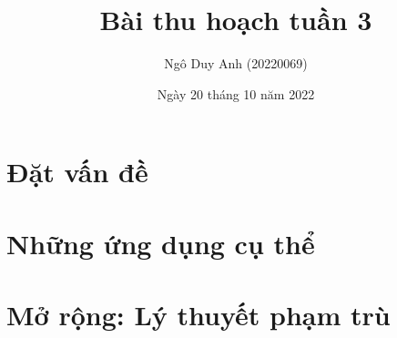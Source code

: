 \documentclass[12pt]{article}
\title{Bài thu hoạch tuần 3}
\author{Ngô Duy Anh (20220069)}
\date{Ngày 20 tháng 10 năm 2022}
\begin{document}


\section{Đặt vấn đề}


\section{Những ứng dụng cụ thể}


\section{Mở rộng: Lý thuyết phạm trù}

\end{document}
